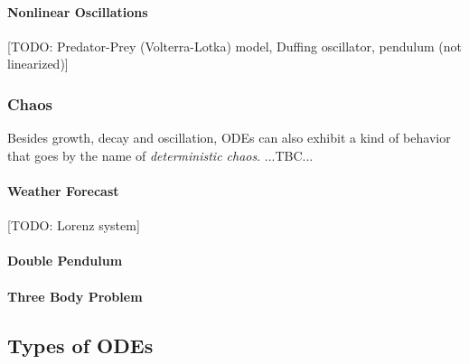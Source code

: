 \paragraph{Nonlinear Oscillations}
[TODO: Predator-Prey (Volterra-Lotka) model, Duffing oscillator, pendulum (not linearized)]


\subsubsection{Chaos}
Besides growth, decay and oscillation, ODEs can also exhibit a kind of behavior that goes by the name of \emph{deterministic chaos}. ...TBC...

\paragraph{Weather Forecast} [TODO: Lorenz system]

\paragraph{Double Pendulum}

\paragraph{Three Body Problem}







\subsection{Types of ODEs}




